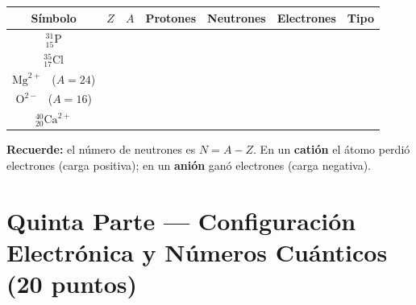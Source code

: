 \documentclass[12pt, letterpaper]{article}
\begin{document}
\vspace{8pt}
\begin{center}
\renewcommand{\arraystretch}{1.55}
\begin{tabular}{|c|c|c|c|c|c|c|}
\hline
\textbf{Símbolo} & $Z$ & $A$ & \textbf{Protones} & \textbf{Neutrones} & \textbf{Electrones} & \textbf{Tipo} \\
\hline
${}^{31}_{15}\text{P}$ & & & & & & \\
\hline
${}^{35}_{17}\text{Cl}$ & & & & & & \\
\hline
$\text{Mg}^{2+}$ \ ($A = 24$) & & & & & & \\
\hline
$\text{O}^{2-}$ \ ($A = 16$) & & & & & & \\
\hline
${}^{40}_{20}\text{Ca}^{2+}$ & & & & & & \\
\hline
\end{tabular}
\end{center}

\vspace{6pt}
\begin{cuadroinfo}
  \small \textbf{Recuerde:} el número de neutrones es $N = A - Z$. En un \textbf{catión} el átomo perdió electrones (carga positiva); en un \textbf{anión} ganó electrones (carga negativa).
\end{cuadroinfo}

\newpage

\section*{Quinta Parte — Configuración Electrónica y Números Cuánticos (20 puntos)}
\end{document}
